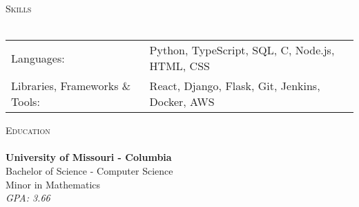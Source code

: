 \documentclass[a4paper]{article}
\newcommand{\lineunder} {
    \vspace*{-8pt} \\
    \hspace*{-18pt} \hrulefill \\
}
\newcommand{\header} [1] {
    {\hspace*{-18pt}\vspace*{6pt} \textsc{#1}}
    \vspace*{-6pt} \lineunder
}
\begin{document}
\header{Skills}
\vspace{1mm}
\begin{tabular}{ l l }
	Languages:               & Python, TypeScript, SQL, C, Node.js, HTML, CSS \\
	Libraries, Frameworks \& Tools: & React, Django, Flask, Git, Jenkins, Docker, AWS \\
\end{tabular}
\vspace{2mm}

\header{Education}
\textbf{University of Missouri - Columbia}\hfill\\
Bachelor of Science - Computer Science \hfill \\
Minor in Mathematics\\
\textit{GPA: 3.66}\\
 
\vspace{2mm}



\ 
\end{document}
